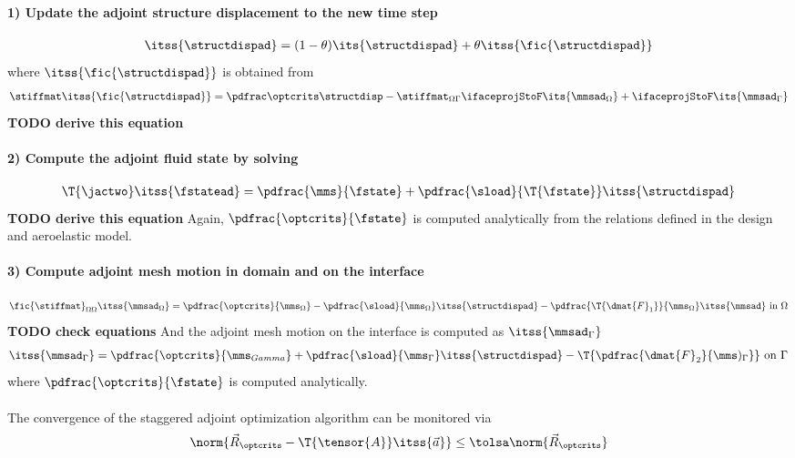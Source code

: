 \documentclass[../main.tex]{subfiles}
\begin{document}
\paragraph{1) Update the adjoint structure displacement to the new time step}
\begin{align}
\itss{\structdispad}=(1-\theta)\its{\structdispad}+\theta \itss{\fic{\structdispad}} \\
\end{align}
where $\itss{\fic{\structdispad}}$ is obtained from
\begin{align}
\stiffmat \itss{\fic{\structdispad}} = \PoptcritsBYstructdisp - \stiffmat_{\Omega\Gamma} \ifaceprojStoF \its{{\mmsad}_{\Omega}} + \ifaceprojStoF \its{{\mmsad}_{\Gamma}}
\end{align}\textbf{TODO derive this equation}

\paragraph{2) Compute the adjoint fluid state by solving}
\begin{align}
\T{\jactwo} \itss{\fstatead} = \pdfrac{\mms}{\fstate}+ \pdfrac{\sload}{\T{\fstate}} \itss{\structdispad}
\end{align}\textbf{TODO derive this equation}
Again, $\pdfrac{\optcrits}{\fstate}$ is computed analytically from the relations defined in the design and aeroelastic model.


\paragraph{3) Compute adjoint mesh motion in domain and on the interface}
\def\PoptcritsBYfstate{\pdfrac{\optcrits}{\fstate}}
\begin{align}
\fic{\stiffmat}_{\Omega\Omega} \itss{{\mmsad}_{\Omega}} =
\pdfrac{\optcrits}{\mms_\Omega} -
\pdfrac{\sload}{\mms_\Omega} \itss{\structdispad} -
\pdfrac{\T{\dmat{F}_1}}{\mms_\Omega} \itss{\mmsad}\text{ in }\Omega
\end{align}\textbf{TODO check equations}
And the adjoint mesh motion on the interface is computed as $\itss{{\mmsad}_{\Gamma}}$
\begin{align}
\itss{{\mmsad}_{\Gamma}} =
\pdfrac{\optcrits}{\mms_{Gamma}} +
\pdfrac{\sload}{\mms_\Gamma} \itss{\structdispad}    -
\T{\pdfrac{\dmat{F}_2}{\mms)_\Gamma}}\text{ on }\Gamma
\end{align}
where $\PoptcritsBYfstate$ is computed analytically.
~\\
~\\
The convergence of the staggered adjoint optimization algorithm can be monitored via
\begin{align}
\norm{\vec{R}_{\optcrits}-
\T{\tensor{A}} \itss{\vec{a}} }
\leq
\tolsa\norm{\vec{R}_{\optcrits}}
\end{align}
\end{document}
